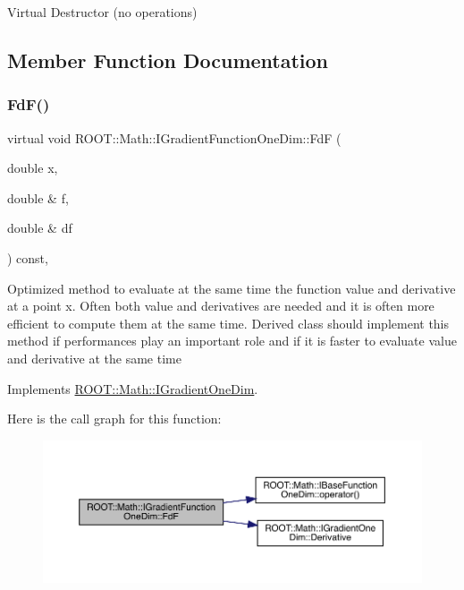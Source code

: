 Virtual Destructor (no operations) 

\subsection{Member Function Documentation}
\mbox{\label{classROOT_1_1Math_1_1IGradientFunctionOneDim_a01eaedb2ae1dfa5722f11281acf7a72b}} 
\subsubsection{\texorpdfstring{FdF()}{FdF()}\hspace{0.1cm}{\footnotesize\ttfamily [1/3]}}
{\footnotesize\ttfamily virtual void R\+O\+O\+T\+::\+Math\+::\+I\+Gradient\+Function\+One\+Dim\+::\+FdF (\begin{DoxyParamCaption}\item[{double}]{x,  }\item[{double \&}]{f,  }\item[{double \&}]{df }\end{DoxyParamCaption}) const\hspace{0.3cm}{\ttfamily [inline]}, {\ttfamily [virtual]}}

Optimized method to evaluate at the same time the function value and derivative at a point x. Often both value and derivatives are needed and it is often more efficient to compute them at the same time. Derived class should implement this method if performances play an important role and if it is faster to evaluate value and derivative at the same time 

Implements \mbox{\hyperlink{classROOT_1_1Math_1_1IGradientOneDim_aef5560ea7d43e64d94bf875713e2a5fc}{R\+O\+O\+T\+::\+Math\+::\+I\+Gradient\+One\+Dim}}.

Here is the call graph for this function\+:
\nopagebreak
\begin{figure}[H]
\begin{center}
\leavevmode
\includegraphics[width=350pt]{d5/d75/classROOT_1_1Math_1_1IGradientFunctionOneDim_a01eaedb2ae1dfa5722f11281acf7a72b_cgraph}
\end{center}
\end{figure}
\mbox{\label{classROOT_1_1Math_1_1IGradientFunctionOneDim_a01eaedb2ae1dfa5722f11281acf7a72b}} 
